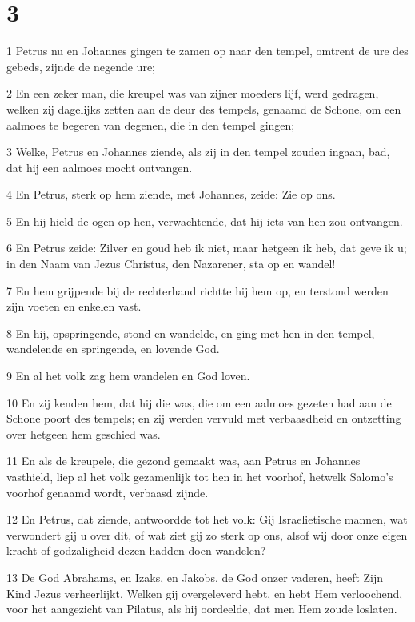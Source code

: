 \chapter{3}

\par 1 Petrus nu en Johannes gingen te zamen op naar den tempel, omtrent de ure des gebeds, zijnde de negende ure;
\par 2 En een zeker man, die kreupel was van zijner moeders lijf, werd gedragen, welken zij dagelijks zetten aan de deur des tempels, genaamd de Schone, om een aalmoes te begeren van degenen, die in den tempel gingen;
\par 3 Welke, Petrus en Johannes ziende, als zij in den tempel zouden ingaan, bad, dat hij een aalmoes mocht ontvangen.
\par 4 En Petrus, sterk op hem ziende, met Johannes, zeide: Zie op ons.
\par 5 En hij hield de ogen op hen, verwachtende, dat hij iets van hen zou ontvangen.
\par 6 En Petrus zeide: Zilver en goud heb ik niet, maar hetgeen ik heb, dat geve ik u; in den Naam van Jezus Christus, den Nazarener, sta op en wandel!
\par 7 En hem grijpende bij de rechterhand richtte hij hem op, en terstond werden zijn voeten en enkelen vast.
\par 8 En hij, opspringende, stond en wandelde, en ging met hen in den tempel, wandelende en springende, en lovende God.
\par 9 En al het volk zag hem wandelen en God loven.
\par 10 En zij kenden hem, dat hij die was, die om een aalmoes gezeten had aan de Schone poort des tempels; en zij werden vervuld met verbaasdheid en ontzetting over hetgeen hem geschied was.
\par 11 En als de kreupele, die gezond gemaakt was, aan Petrus en Johannes vasthield, liep al het volk gezamenlijk tot hen in het voorhof, hetwelk Salomo's voorhof genaamd wordt, verbaasd zijnde.
\par 12 En Petrus, dat ziende, antwoordde tot het volk: Gij Israelietische mannen, wat verwondert gij u over dit, of wat ziet gij zo sterk op ons, alsof wij door onze eigen kracht of godzaligheid dezen hadden doen wandelen?
\par 13 De God Abrahams, en Izaks, en Jakobs, de God onzer vaderen, heeft Zijn Kind Jezus verheerlijkt, Welken gij overgeleverd hebt, en hebt Hem verloochend, voor het aangezicht van Pilatus, als hij oordeelde, dat men Hem zoude loslaten.
